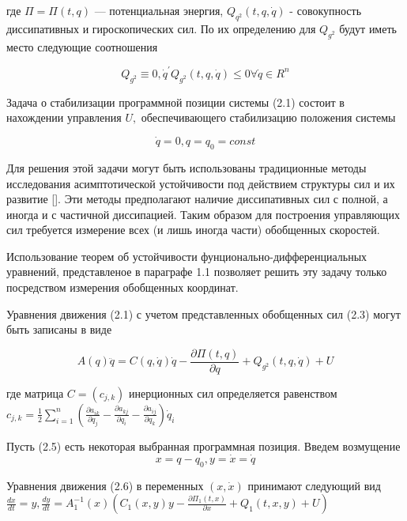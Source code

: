  где $\Pi = \Pi(t, q)$ --- потенциальная энергия, $Q_{q^2}(t, q, \dot q)$ - совокупность диссипативных и гироскопических сил. По их определению для $Q_{g^2}$ будут иметь место следующие соотношения
 
 \begin{equation}
   Q_{g^2} \equiv 0, \dot q^{'} Q_{g^2} (t, q, \dot q) \le 0 \forall \dot q \in R^n
 \end{equation}
 
Задача о стабилизации программной позиции системы (2.1) состоит в нахождении управления $U,$ обеспечивающего стабилизацию положения системы 

\begin{equation}
\dot q = 0, q = q_0 = const
\end{equation}

Для решения этой задачи могут быть использованы традиционные методы исследования асимптотической устойчивости под действием структуры сил и их развитие []. Эти методы предполагают наличие диссипативных сил с полной, а иногда и с частичной диссипацией. Таким образом для построения управляющих сил требуется измерение всех (и лишь иногда части) обобщенных скоростей. 

Использование теорем об устойчивости фунционально-дифференциальных уравнений, представленое в параграфе 1.1 позволяет решить эту задачу только посредством измерения обобщенных координат.

Уравнения движения (2.1) с учетом представленных обобщенных сил (2.3) могут быть записаны в виде 

 \begin{equation}
 A(q) \ddot q = C(q, \dot q) \dot q - \frac{\partial \Pi(t, q)}{\partial q} + Q_{g^2}(t, q, \dot q) + U
 \end{equation}

 где матрица $C = (c_{j,k})$ инерционных сил определяется равенством $c_{j,k} = \frac12 \sum_{i =1}^{n} (\frac{\partial a_{ik} } {\partial q_j} - \frac{\partial a_{kj}}{\partial q_i} - \frac{\partial a_{ij}}{\partial q_k}) \dot q_i$

Пусть (2.5) есть некоторая выбранная программная позиция. Введем возмущение
\begin{equation}
x = q - q_0, y = \dot x = \dot q
\end{equation}
 
Уравнения движения (2.6) в переменных $(x, \dot x)$ принимают следующий вид $\frac{dx}{dt} = y, \frac{dy}{dt} = A^{-1}_1(x) (C_1(x, y) y - \frac{\partial \Pi_1 (t, x)}{\partial x} + Q_1 (t, x, y) + U)$

